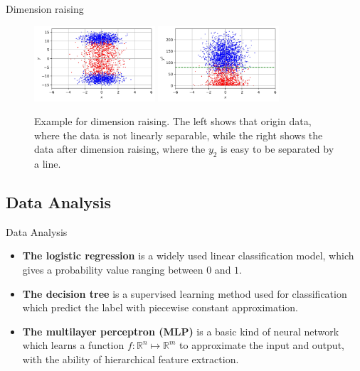 \documentclass{beamer}
\begin{document}
\begin{frame}{Dimension raising}

  \begin{figure}[H]
    \centering
    \includegraphics[width=0.4\textwidth]{./figure/Sample-Raising-1.jpg}
    \includegraphics[width=0.4\textwidth]{./figure/Sample-Raising-2.jpg}
    \caption{Example for dimension raising. The left shows that origin data, where the data is not linearly separable, while the right shows the data after dimension raising, where the $y_2$ is easy to be separated by a line.}
  \end{figure}

\end{frame}

\subsection{Data Analysis}

\begin{frame}{Data Analysis}

  \begin{itemize}
    \item \textbf{The logistic regression}   is a widely used linear classification model, which gives a probability value ranging between $0$ and $1$. \vspace{.25cm}
    \item \textbf{The decision tree}   is a supervised learning method used for classification which predict the label with piecewise constant approximation.
    \item \textbf{The multilayer perceptron (MLP)}   is a basic kind of neural network which learns a function $f: \mathbb{R}^n \mapsto \mathbb{R}^m$ to approximate the input and output, with the ability of hierarchical feature extraction.
  \end{itemize}

\end{frame}
\end{document}
